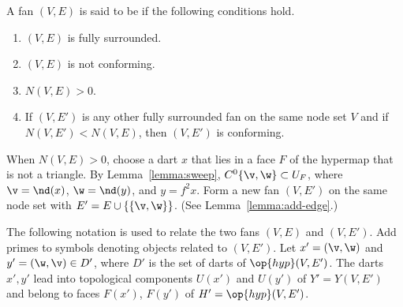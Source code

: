 \begin{definition}
A fan $(V,E)$ is said to be  if
the following conditions hold.
\begin{enumerate}\wasitemize 
\item $(V,E)$ is fully surrounded.
\item $(V,E)$ is not conforming.
\item $N(V,E)>0$.
\item If $(V,E')$ is any other fully surrounded fan on the same node
set $V$ and if $N(V,E') < N(V,E)$, then $(V,E')$ is conforming.
\end{enumerate}\wasitemize 
\end{definition}
%



\begin{remark}\label{remark:reduction}
  When $N(V,E)>0$, choose a dart $x$ that lies in a face $F$ of the
  hypermap that is not a triangle.  By Lemma~\ref{lemma:sweep},
  $C^0\{\v,\w\}\subset U_F$, where $\v=\nd(x)$, $\w=\nd(y)$, and
  $y=f^2 x$.  Form a new fan $(V,E')$ on the same node set with $E' =
  E\cup \{\{\v,\w\}\}$.  (See Lemma~\ref{lemma:add-edge}.)

The following notation is used to relate the two fans $(V,E)$ and $(V,E')$.  
Add primes to symbols
denoting objects related to $(V,E')$.
Let $x'=(\v,\w)$ and $y'=(\w,\v)\in D'$, where $D'$ is the set of darts of $\op{hyp}(V,E')$.
The darts $x',y'$ lead into topological components
$U(x')$ and $U(y')$ of $Y'=Y(V,E')$ and belong to faces $F(x')$,
$F(y')$ of $H'=\op{hyp}(V,E')$.
\end{remark}

